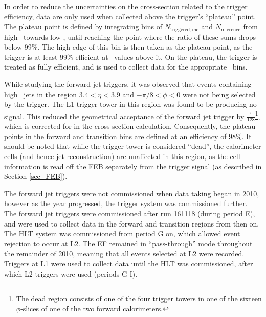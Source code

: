 In order to reduce the uncertainties on the cross-section related to the trigger efficiency, data are only used when collected above the trigger's ``plateau'' point. The plateau point is defined by integrating bins of $N_\mathrm{triggered,inc}$ and $N_\mathrm{reference}$ from high \pt~towards low \pt, until reaching the point where the ratio of these sums drops below 99\%. The high edge of this bin is then taken as the plateau point, as the trigger is at least 99\% efficient at \pt~values above it. On the plateau, the trigger is treated as fully efficient, and is used to collect data for the appropriate \pt~bins. 

While studying the forward jet triggers, it was observed that events containing high \pt~jets in the region $3.4 < \eta<3.9$ and $-\pi/8 < \phi < 0$ were not being selected by the trigger. The L1 trigger tower in this region was found to be producing no signal. This reduced the geometrical acceptance of the forward jet trigger by $\frac{1}{128}$\footnote{The dead region consists of one of the four trigger towers in one of the sixteen $\phi$-slices of one of the two forward calorimeters.}, which is corrected for in the cross-section calculation. Consequently, the plateau points in the forward and transition bins are defined at an efficiency of 98\%. It should be noted that while the trigger tower is considered ``dead'', the calorimeter cells (and hence jet reconstruction) are unaffected in this region, as the cell information is read off the FEB separately from the trigger signal (as described in Section \ref{sec_FEB}).


The forward jet triggers were not commissioned when data taking began in 2010, however as the year progressed, the trigger system was commissioned further. The forward jet triggers were commissioned after run 161118 (during period E), and were used to collect data in the forward and transition regions from then on. The HLT system was commissioned from period G on, which allowed event rejection to occur at L2. The EF remained in ``pass-through'' mode throughout the remainder of 2010, meaning that all events selected at L2 were recorded. Triggers at L1 were used to collect data until the HLT was commissioned, after which L2 triggers were used (periods G-I). 


